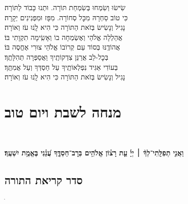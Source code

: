 \documentclass[twoside, openany, parskip=half, 11pt]{book}
\begin{document}
שִׂישׂוּ וְשִׂמְחוּ בְּשִׂמְחַת תּוֹרָה. \hfill וּתְנוּ כָּבוֹד לַתּוֹרָה׃\\
כִּי טוֹב סַחְרָהּ מִכׇּל סְחוֹרָה. \hfill מִפָּז וּמִפְּנִינִים יְקָרָה׃\\
נָגִיל וְנָשִׂישׂ בְּזֹאת הַתּוֹרָה \hfill כִּי הִיא לָֽנוּ עֹז וְאוֹרָה׃\\
אֲהַלְלָה אֱלֹהַי וְאֶשְׂמְחָה בוֹ \hfill וְאָשִֽׂימָה תִקְוָתִי בּוֹ׃\\
אֲהוֹדֶֽנּוּ בְּסוֹד עַם קְרוֹבוֹ \hfill אֱלֹהֵי צוּרִי אֶחֱסֶה בּוֹ׃\\
בְּכׇל-לֵב אֲרַנֵּן צִדְקוֹתֶֽיךָ \hfill וַאֲסַפְּרָה תְּהִלָּתֶֽךָ׃\\
בְּעוֹדִי אַגִּיד נִפְלְאוֹתֶֽיךָ \hfill עַל חַסְדְּךָ וְעַל אֲמִתֶּֽךָ׃\\
נָגִיל וְנָשִׂישׂ בְּזֹאת הַתּוֹרָה \hfill כִּי הִיא לָֽנוּ עֹז וְאוֹרָה׃

\vfill
{}


\sepline



%
\blankpage
\chapter[מנחה לשבת ויו״ט]{ מנחה לשבת ויום טוב }
\tamid

\ketoret
\sepline\\

\ashrei

\uvaletzion

\halfkaddish


\textbf{
וַאֲנִ֤י תְפִלָּֽתִי־לְךָ֨ ׀ יְיָ֡ עֵ֤ת רָצ֗וֹן אֱלֹהִ֥ים בְּרׇב־חַסְדֶּ֑ךָ עֲ֝נֵ֗נִי בֶּאֱמֶ֥ת יִשְׁעֶֽךָ׃ } 

\section[סדר קריאת התורה]{ סדר קריאת התורה }


\pesicha

\brikhshmei

\gadlu

\avharachamim

\vesigale

ֺ%

\torahbarachu
\end{document}
